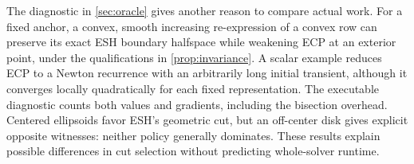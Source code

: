 The diagnostic in \cref{sec:oracle} gives another reason to compare actual work. For a fixed anchor, a convex, smooth increasing re-expression of a convex row can preserve its exact ESH boundary halfspace while weakening ECP at an exterior point, under the qualifications in \cref{prop:invariance}. A scalar example reduces ECP to a Newton recurrence with an arbitrarily long initial transient, although it converges locally quadratically for each fixed representation. The executable diagnostic counts both values and gradients, including the bisection overhead. Centered ellipsoids favor ESH's geometric cut, but an off-center disk gives explicit opposite witnesses: neither policy generally dominates. These results explain possible differences in cut selection without predicting whole-solver runtime.
